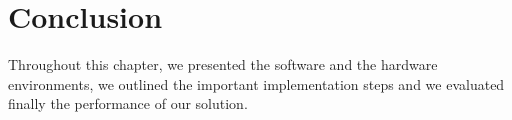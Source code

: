%
%
%
%
%

\section*{Conclusion}

 Throughout this chapter, we presented the software and the hardware environments, we outlined the
 important implementation steps and we evaluated finally the performance of our solution.
